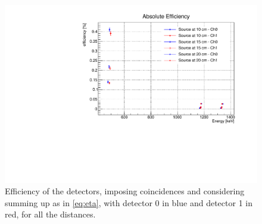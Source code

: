 \begin{figure}[H]
    \centering
    \includegraphics[scale=0.5]{Images/analysis/efficiency/Eff_coinc.pdf}
    \caption{Efficiency of the detectors, imposing coincidences and considering summing up as in \ref{eq:eta}, with detector 0 in blue and detector 1 in red, for all the distances.}
    \label{fig:eff_coinc}
\end{figure}

